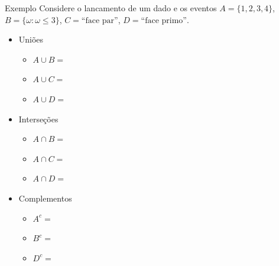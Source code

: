 \documentclass[10pt]{beamer}\usepackage[]{graphicx}\usepackage[]{color}
\theoremstyle{definition}
\begin{document}

\begin{frame}[fragile]{Exemplo}
  Considere o lancamento de um dado e os eventos $A = \{1,2,3,4\}$, $B =
  \{\omega:\omega\leq 3\}$, $C = \text{``face par''}$, $D = \text{``face
    primo''}$.
  \begin{itemize}
  \item Uniões
    \begin{itemize}
    \item $A\cup B =$ %
    \item $A\cup C =$ %
    \item $A\cup D =$ %
    \end{itemize}
  \end{itemize}
  \begin{itemize}
  \item Interseções
    \begin{itemize}
    \item $A\cap B =$ %
    \item $A\cap C =$ %
    \item $A\cap D =$ %
    \end{itemize}
  \end{itemize}
  \begin{itemize}
  \item Complementos
    \begin{itemize}
    \item $A^c =$ %
    \item $B^c =$ %
    \item $D^c =$ %
    \end{itemize}
  \end{itemize}
\end{frame}
\end{document}
